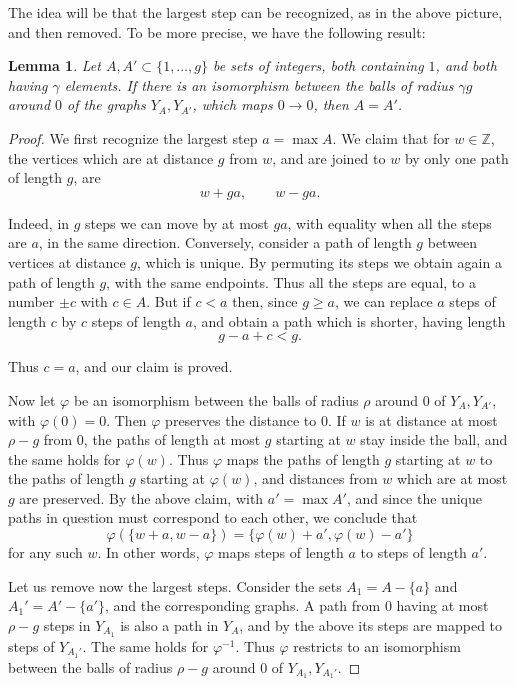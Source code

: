 \documentclass[11pt,a4paper]{article}
\newtheorem{lem}[thm]{Lemma}
\begin{document}
The idea will be that the largest step can be recognized, as in the above picture, and then removed. To be more precise, we have the following result:

\begin{lem}\label{steps}
Let $A,A'\subset\{1,\ldots,g\}$ be sets of integers, both containing $1$, and both having $\gamma$ elements. If there is an isomorphism between the balls of radius $\gamma g$ around $0$ of the graphs $Y_A,Y_{A'}$, which maps $0\to0$, then $A=A'$.
\end{lem}

\begin{proof}
We first recognize the largest step $a=\max A$. We claim that for $w\in\mathbb Z$, the vertices which are at distance $g$ from $w$, and are joined to $w$ by only one path of length $g$, are
\[
 w+ga,\qquad w-ga.
\]

Indeed, in $g$ steps we can move by at most $ga$, with equality when all the steps are $a$, in the same direction. Conversely, consider a path of length $g$ between vertices at distance $g$, which is unique. By permuting its steps we obtain again a path of length $g$, with the same endpoints. Thus all the steps are equal, to a number $\pm c$ with $c\in A$. But if $c<a$ then, since $g\geq a$, we can replace $a$ steps of length $c$ by $c$ steps of length $a$, and obtain a path which is shorter, having length
\[
 g-a+c<g.
\]

Thus $c=a$, and our claim is proved.

Now let $\varphi$ be an isomorphism between the balls of radius $\rho$ around $0$ of $Y_A,Y_{A'}$, with $\varphi(0)=0$. Then $\varphi$ preserves the distance to $0$. If $w$ is at distance at most $\rho-g$ from $0$, the paths of length at most $g$ starting at $w$ stay inside the ball, and the same holds for $\varphi(w)$. Thus $\varphi$ maps the paths of length $g$ starting at $w$ to the paths of length $g$ starting at $\varphi(w)$, and distances from $w$ which are at most $g$ are preserved. By the above claim, with $a'=\max A'$, and since the unique paths in question must correspond to each other, we conclude that
\[
 \varphi(\{w+a,w-a\})=\{\varphi(w)+a',\varphi(w)-a'\}
\]
for any such $w$. In other words, $\varphi$ maps steps of length $a$ to steps of length $a'$.

Let us remove now the largest steps. Consider the sets $A_1=A-\{a\}$ and $A_1'=A'-\{a'\}$, and the corresponding graphs. A path from $0$ having at most $\rho-g$ steps in $Y_{A_1}$ is also a path in $Y_A$, and by the above its steps are mapped to steps of $Y_{A_1'}$. The same holds for $\varphi^{-1}$. Thus $\varphi$ restricts to an isomorphism between the balls of radius $\rho-g$ around $0$ of $Y_{A_1},Y_{A_1'}$.


\end{proof}
\end{document}

